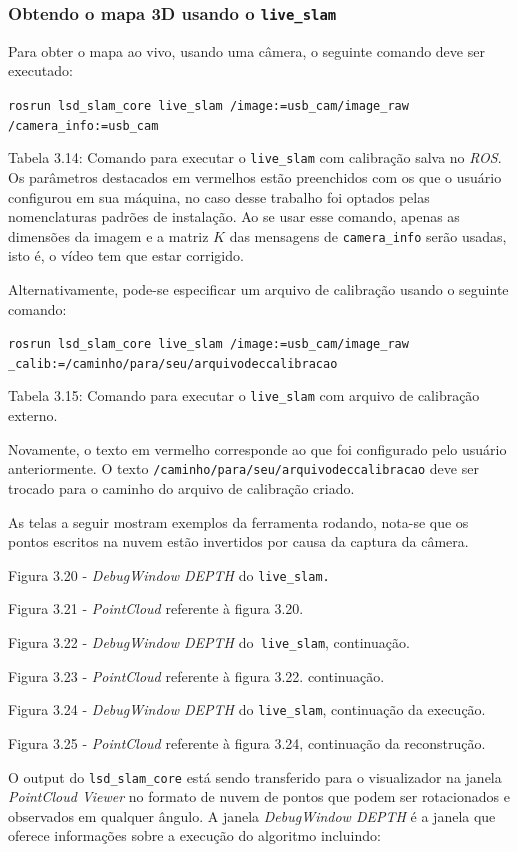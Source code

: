 \subsubsection{Obtendo o mapa 3D usando o \texttt{live\_slam}}

Para obter o mapa ao vivo, usando uma câmera, o seguinte comando deve ser executado:

\texttt{rosrun lsd\_slam\_core live\_slam /image:=usb\_cam/image\_raw /camera\_info:=usb\_cam}

Tabela 3.14: Comando para executar o \texttt{live\_slam} com calibração salva no \textit{ROS}.
Os parâmetros destacados em vermelhos estão preenchidos com os que o usuário configurou em sua máquina, no caso desse trabalho foi optados pelas nomenclaturas padrões de instalação. Ao se usar esse comando, apenas as dimensões da imagem e a matriz $K$ das mensagens de \texttt{camera\_info} serão usadas, isto é, o vídeo tem que estar corrigido.

Alternativamente, pode-se especificar um arquivo de calibração usando o seguinte comando:

\texttt{rosrun lsd\_slam\_core live\_slam /image:=usb\_cam/image\_raw \_calib:=/caminho/para/seu/arquivodeccalibracao}

Tabela 3.15: Comando para executar o \texttt{live\_slam} com arquivo de calibração externo.

Novamente, o texto em vermelho corresponde ao que foi configurado pelo usuário anteriormente. O texto \texttt{/caminho/para/seu/arquivodeccalibracao} deve ser trocado para o caminho do arquivo de calibração criado.

As telas a seguir mostram exemplos da ferramenta rodando, nota-se que os pontos escritos na nuvem estão invertidos por causa da captura da câmera. 

Figura 3.20 - \textit{DebugWindow DEPTH} do \texttt{live\_slam.}

Figura 3.21 - \textit{PointCloud} referente à figura 3.20.


Figura 3.22 - \textit{DebugWindow DEPTH} do\texttt{ live\_slam}, continuação.

Figura 3.23 - \textit{PointCloud} referente à figura 3.22. continuação.

Figura 3.24 - \textit{DebugWindow DEPTH} do \texttt{live\_slam}, continuação da execução.

Figura 3.25 - \textit{PointCloud} referente à figura 3.24, continuação da reconstrução.

O output do \texttt{lsd\_slam\_core} está sendo transferido para o visualizador na janela \textit{PointCloud Viewer} no formato de nuvem de pontos que podem ser rotacionados e observados em qualquer ângulo. A janela \textit{DebugWindow DEPTH} é a janela que oferece informações sobre a execução do algoritmo incluindo:

